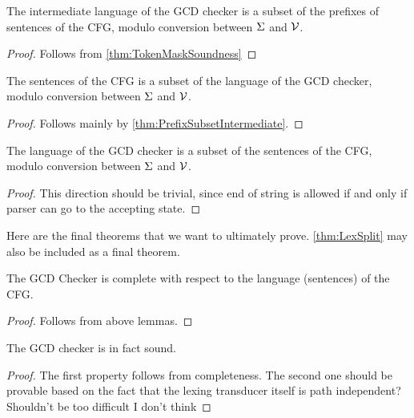 \begin{theorem}
    \label{thm:IntermediateSubsetPrefix} 
    The intermediate language of the GCD checker is a subset of the prefixes of sentences of the CFG, modulo conversion between $\Sigma$ and $\mathcal{V}$.
\end{theorem}
\begin{proof}
    Follows from \ref{thm:TokenMaskSoundness}
\end{proof}

\begin{theorem}
    \label{thm:GrammarSubsetCheckerLang}
    The sentences of the CFG is a subset of the language of the GCD checker, modulo conversion between $\Sigma$ and $\mathcal{V}$.
\end{theorem}
\begin{proof}
    Follows mainly by \ref{thm:PrefixSubsetIntermediate}.
\end{proof}

\begin{theorem}
    \label{thm:CheckerLangSubsetGrammar}
    The language of the GCD checker is a subset of the sentences of the CFG, modulo conversion between $\Sigma$ and $\mathcal{V}$.
\end{theorem}
\begin{proof}
    This direction should be trivial, since end of string is allowed if and only if parser can go to the accepting state. 
\end{proof}

Here are the final theorems that we want to ultimately prove. \ref{thm:LexSplit} may also be included as a final theorem.
\begin{theorem}
    \label{thm:GCDCheckerComplete}
    The GCD Checker is complete with respect to the language (sentences) of the CFG.
\end{theorem}
\begin{proof}
    Follows from above lemmas.
\end{proof}

\begin{theorem}
    \label{thm:GCDCheckerSound}
    The GCD checker is in fact sound.
\end{theorem}
\begin{proof}
    The first property follows from completeness. The second one should be provable based on the fact that the lexing transducer itself is path independent? Shouldn't be too difficult I don't think
\end{proof}

